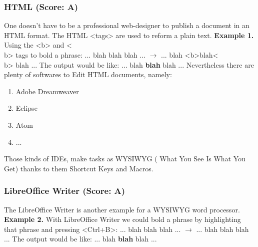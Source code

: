 \documentclass[twocolumn]{article}
\begin{document}
\subsubsection{HTML (Score: A)}
One doesn't have to be a professional web-designer to publish a document in an
HTML format. The HTML <tags> are used to reform a plain text.
\newline
\textbf{Example 1.} Using the <b> and <\\b> tags to bold a phrase:
\newline
... blah blah blah ...
$\rightarrow$
... blah <b>blah<\\b> blah ...
\newline
The output would be like:
\newline
... blah \textbf{blah} blah ...
\newline
Nevertheless there are plenty of softwares to Edit HTML documents, namely:
\begin{enumerate}
\item Adobe Dreamweaver
\item Eclipse
\item Atom
\item ...
\end{enumerate}
Those kinds of IDEs, make tasks as WYSIWYG ( What You See Is What You Get)
thanks to them Shortcut Keys and Macros.
\subsubsection{LibreOffice Writer (Score: A)}
The LibreOffice Writer is another example for a WYSIWYG word processor.
\newline
\textbf{Example 2.} With LibreOffice Writer we could bold a phrase by
highlighting that phrase and pressing <Ctrl+B>:
\newline
... blah blah blah ...
$\rightarrow$
... blah blah blah ...
\newline
The output would be like:
\newline
... blah \textbf{blah} blah ...
\end{document}
